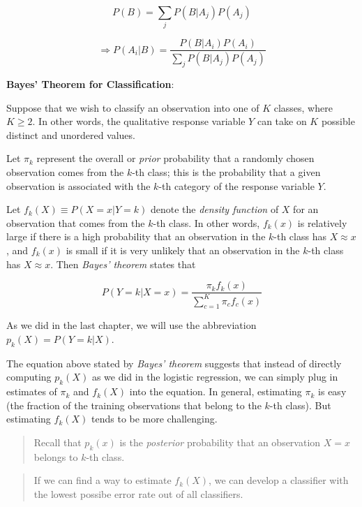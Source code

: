 \documentclass[]{book}
\theoremstyle{definition}
\theoremstyle{definition}
\theoremstyle{definition}
\theoremstyle{remark}
\begin{document}
\[ P(B) = \sum_j P(B|A_j) P(A_j) \]

\[ \Rightarrow P(A_i|B) = \frac{P(B|A_i) P(A_i)}{\sum_j P(B|A_j) P(A_j)} \]

\textbf{Bayes' Theorem for Classification}:

Suppose that we wish to classify an observation into one of \(K\)
classes, where \(K \geq 2\). In other words, the qualitative response
variable \(Y\) can take on \(K\) possible distinct and unordered values.

Let \(\pi_k\) represent the overall or \emph{prior} probability that a
randomly chosen observation comes from the \(k\)-th class; this is the
probability that a given observation is associated with the \(k\)-th
category of the response variable \(Y\).

Let \(f_k(X) \equiv P(X = x|Y = k)\) denote the \emph{density function}
of \(X\) for an observation that comes from the \(k\)-th class. In other
words, \(f_k(x)\) is relatively large if there is a high probability
that an observation in the \(k\)-th class has \(X \approx x\), and
\(f_k(x)\) is small if it is very unlikely that an observation in the
\(k\)-th class has \(X \approx x\). Then \emph{Bayes' theorem} states
that

\begin{equation}
P(Y=k|X=x) = \frac{ \pi_k f_k(x)}{\sum_{c=1}^K \pi_c f_c(x)}
\label{eq:bayes}
\end{equation}

As we did in the last chapter, we will use the abbreviation
\(p_k(X) =P(Y = k|X)\).

The equation above stated by \emph{Bayes' theorem} suggests that instead
of directly computing \(p_k(X)\) as we did in the logistic regression,
we can simply plug in estimates of \(\pi_k\) and \(f_k(X)\) into the
equation. In general, estimating \(\pi_k\) is easy (the fraction of the
training observations that belong to the \(k\)-th class). But estimating
\(f_k(X)\) tends to be more challenging.

\begin{quote}
Recall that \(p_k(x)\) is the \emph{posterior} probability that an
observation \(X=x\) belongs to \(k\)-th class.
\end{quote}

\begin{quote}
If we can find a way to estimate \(f_k(X)\), we can develop a classifier
with the lowest possibe error rate out of all classifiers.
\end{quote}
\end{document}

